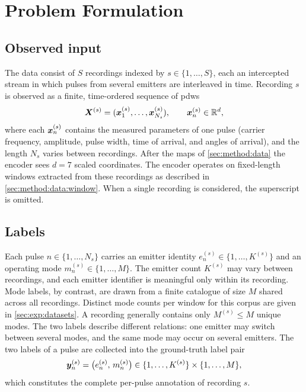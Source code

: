 \section{Problem Formulation}\label{sec:method:formulation}

\subsection*{Observed input}

The data consist of $S$ recordings indexed by $s \in \{1,\ldots,S\}$, each an intercepted stream in which pulses from several emitters are interleaved in time.
Recording $s$ is observed as a finite, time-ordered sequence of \glspl{pdw}
\[
  \bm{X}^{(s)} = (\bm{x}^{(s)}_1,\ldots,\bm{x}^{(s)}_{N_s}),
  \qquad
  \bm{x}^{(s)}_n \in \mathbb{R}^{d},
\]
where each $\bm{x}^{(s)}_n$ contains the measured parameters of one pulse (carrier frequency, amplitude, pulse width, time of arrival, and angles of arrival), and the length $N_s$ varies between recordings.
After the maps of \cref{sec:method:data} the encoder sees $d=7$ scaled coordinates.
The encoder operates on fixed-length windows extracted from these recordings as described in \cref{sec:method:data:window}.
When a single recording is considered, the superscript is omitted.

\subsection*{Labels}

Each pulse $n \in \{1,\ldots,N_s\}$ carries an emitter identity $e^{(s)}_n \in \{1,\ldots,K^{(s)}\}$ and an operating mode $m^{(s)}_n \in \{1,\ldots,M\}$.
The emitter count $K^{(s)}$ may vary between recordings, and each emitter identifier is meaningful only within its recording.
Mode labels, by contrast, are drawn from a finite catalogue of size $M$ shared across all recordings.
Distinct mode counts per window for this corpus are given in \cref{sec:exp:datasets}.
A recording generally contains only $M^{(s)} \leq M$ unique modes.
The two labels describe different relations: one emitter may switch between several modes, and the same mode may occur on several emitters.
The two labels of a pulse are collected into the ground-truth label pair
\begin{equation}\label{eq:method:label_pair}
  \bm{y}^{(s)}_n = \bigl(e^{(s)}_n,\, m^{(s)}_n\bigr)
  \in \{1,\ldots,K^{(s)}\} \times \{1,\ldots,M\},
\end{equation}
which constitutes the complete per-pulse annotation of recording $s$.

